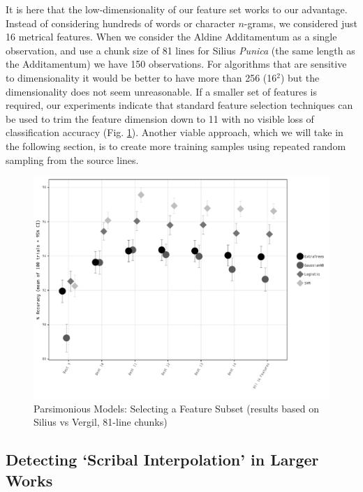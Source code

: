 \documentclass[11pt,a4paper]{scrartcl} %
\begin{document}
{It is here that the low-dimensionality of our feature set works to our advantage. Instead of considering hundreds of words or character $n$-grams, we considered just 16 metrical features. When we consider the Aldine Additamentum as a single observation, and use a chunk size of 81 lines for Silius \textit{Punica} (the same length as the Additamentum) we have 150 observations. For algorithms that are sensitive to dimensionality it would be better to have more than 256 (16$^{2}$) but the dimensionality does not seem unreasonable. If a smaller set of features is required, our experiments indicate that standard feature selection techniques can be used to trim the feature dimension down to 11 with no visible loss of classification accuracy (Fig. \ref{fig:glob_feat_sel}). Another viable approach, which we will take in the following section, is to create more training samples using repeated random sampling from the source lines.

\begin{figure}
    \caption{Parsimonious Models: Selecting a Feature Subset (results based on Silius vs Vergil, 81-line chunks)}
    \label{fig:glob_feat_sel}
    \includegraphics[width=\textwidth]{glob_feat_sel_bw.pdf}
\end{figure}

\subsection{Detecting `Scribal Interpolation' in Larger Works}

}
\end{document}
